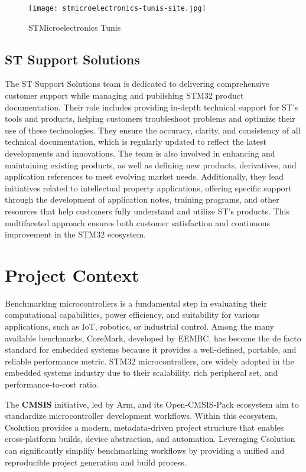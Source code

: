  \begin{figure}[htp]
  \centering
  \texttt{[image: stmicroelectronics-tunis-site.jpg]}
  \caption{STMicroelectronics Tunis}
  \label{fig:talan_graphe}
\end{figure}


\subsection{ST Support Solutions }
The ST Support Solutions team is dedicated to delivering comprehensive customer support while managing and publishing STM32 product documentation. Their role includes providing in-depth technical support for ST’s tools and products, helping customers troubleshoot problems and optimize their use of these technologies. They ensure the accuracy, clarity, and consistency of all technical documentation, which is regularly updated to reflect the latest developments and innovations. The team is also involved in enhancing and maintaining existing products, as well as defining new products, derivatives, and application references to meet evolving market needs. Additionally, they lead initiatives related to intellectual property applications, offering specific support through the development of application notes, training programs, and other resources that help customers fully understand and utilize ST’s products. This multifaceted approach ensures both customer satisfaction and continuous improvement in the STM32 ecosystem.

\section {Project Context}

Benchmarking microcontrollers is a fundamental step in evaluating their computational capabilities, power efficiency, and suitability for various applications, such as IoT, robotics, or industrial control. Among the many available benchmarks, CoreMark, developed by EEMBC, has become the de facto standard for embedded systems because it provides a well-defined, portable, and reliable performance metric.
STM32 microcontrollers, are widely adopted in the embedded systems industry due to their scalability, rich peripheral set, and performance-to-cost ratio.

The \textbf{CMSIS} initiative, led by Arm, and its Open-CMSIS-Pack ecosystem aim to standardize microcontroller development workflows. Within this ecosystem, Csolution provides a modern, metadata-driven project structure that enables cross-platform builds, device abstraction, and automation. Leveraging Csolution can significantly simplify benchmarking workflows by providing a unified and reproducible project generation and build process.

